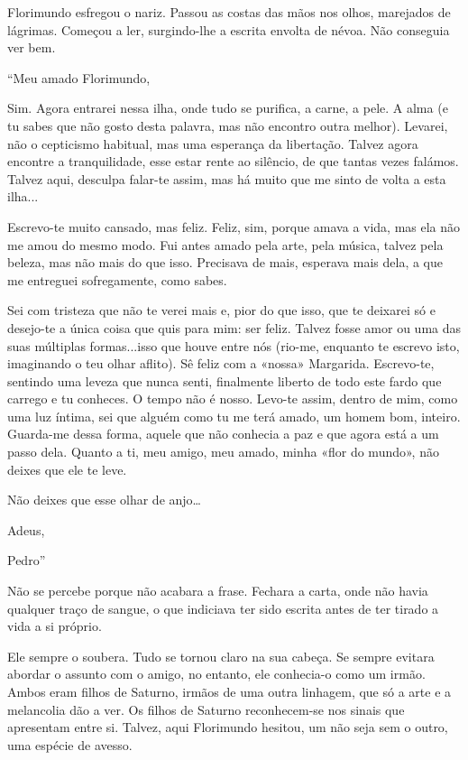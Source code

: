 Florimundo esfregou o nariz. Passou as costas das mãos nos olhos,
marejados de lágrimas. Começou a ler, surgindo-lhe a escrita envolta de
névoa. Não conseguia ver bem.

``Meu amado Florimundo,

Sim. Agora entrarei nessa ilha, onde tudo se purifica, a carne, a pele.
A alma (e tu sabes que não gosto desta palavra, mas não encontro outra
melhor). Levarei, não o cepticismo habitual, mas uma esperança da
libertação. Talvez agora encontre a tranquilidade, esse estar rente ao
silêncio, de que tantas vezes falámos. Talvez aqui, desculpa falar-te
assim, mas há muito que me sinto de volta a esta ilha...

Escrevo-te muito cansado, mas feliz. Feliz, sim, porque amava a vida,
mas ela não me amou do mesmo modo. Fui antes amado pela arte, pela
música, talvez pela beleza, mas não mais do que isso. Precisava de mais,
esperava mais dela, a que me entreguei sofregamente, como sabes.

Sei com tristeza que não te verei mais e, pior do que isso, que te
deixarei só e desejo-te a única coisa que quis para mim: ser feliz.
Talvez fosse amor ou uma das suas múltiplas formas...isso que houve
entre nós (rio-me, enquanto te escrevo isto, imaginando o teu olhar
aflito). Sê feliz com a «nossa» Margarida. Escrevo-te, sentindo uma
leveza que nunca senti, finalmente liberto de todo este fardo que
carrego e tu conheces. O tempo não é nosso. Levo-te assim, dentro de
mim, como uma luz íntima, sei que alguém como tu me terá amado, um homem
bom, inteiro. Guarda-me dessa forma, aquele que não conhecia a paz e que
agora está a um passo dela. Quanto a ti, meu amigo, meu amado, minha
«flor do mundo», não deixes que ele te leve.

Não deixes que esse olhar de anjo\ldots{}

Adeus,

Pedro''

Não se percebe porque não acabara a frase. Fechara a carta, onde não
havia qualquer traço de sangue, o que indiciava ter sido escrita antes
de ter tirado a vida a si próprio.

Ele sempre o soubera. Tudo se tornou claro na sua cabeça. Se sempre
evitara abordar o assunto com o amigo, no entanto, ele conhecia-o como
um irmão. Ambos eram filhos de Saturno, irmãos de uma outra linhagem,
que só a arte e a melancolia dão a ver. Os filhos de Saturno
reconhecem-se nos sinais que apresentam entre si. Talvez, aqui
Florimundo hesitou, um não seja sem o outro, uma espécie de avesso.

